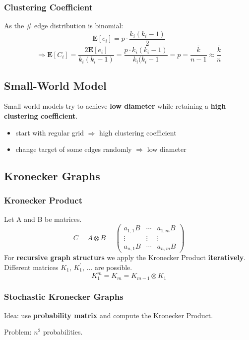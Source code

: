 \documentclass[parskip=full]{scrartcl}
\begin{document}
\subsubsection{Clustering Coefficient}
As the \# edge distribution is binomial:
\[\mathbf{E}[e_i] = p \cdot \frac{k_i(k_i - 1)}{2}\]
\[\Longrightarrow \mathbf{E}[C_i] = \frac{2\mathbf{E}[e_i]}{k_i(k_i-1)} = \frac{p \cdot k_i(k_i-1)}{k_i(k_i-1} = p = \frac{\overline{k}}{n-1} \approx \frac{\overline{k}}{n}\]

\subsection{Small-World Model}
Small world models try to achieve \textbf{low diameter} while retaining a \textbf{high clustering coefficient}.
\begin{itemize}
	\item start with regular grid $\Rightarrow$ high clustering coefficient
	\item change target of some edges randomly $\Rightarrow$ low diameter
\end{itemize}

\subsection{Kronecker Graphs}

\subsubsection{Kronecker Product}
Let A and B be matrices.
\[C = A \otimes B = 
\begin{pmatrix}
a_{1,1}B & \cdots & a_{1,m}B \\
\vdots & \vdots & \vdots \\
a_{n,1}B & \cdots & a_{n,m}B
\end{pmatrix}\]
For \textbf{recursive graph structurs} we apply the Kronecker Product \textbf{iteratively}. Different matrices $K_1$, $K_1^{'}$, $\ldots$ are possible.
\[K_1^{m} = K_m = K_{m-1} \otimes K_1\]

\subsubsection{Stochastic Kronecker Graphs}
Idea: use \textbf{probability matrix} and compute the Kronecker Product.

Problem: $n^2$ probabilities.
\end{document}

